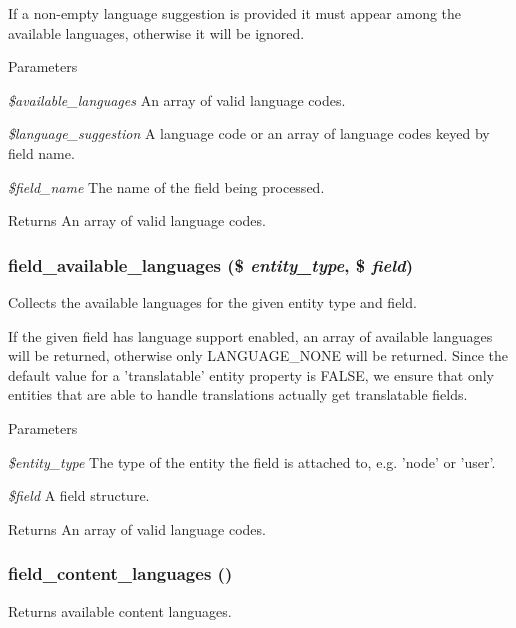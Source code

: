 If a non-\/empty language suggestion is provided it must appear among the available languages, otherwise it will be ignored.


\begin{DoxyParams}{Parameters}
\item[{\em \$available\_\-languages}]An array of valid language codes. \item[{\em \$language\_\-suggestion}]A language code or an array of language codes keyed by field name. \item[{\em \$field\_\-name}]The name of the field being processed.\end{DoxyParams}
\begin{DoxyReturn}{Returns}
An array of valid language codes. 
\end{DoxyReturn}
\hypertarget{group__field__language_ga3dbd9611836d9bba15c15f0a8ae83c9b}{
\subsubsection[{field\_\-available\_\-languages}]{\setlength{\rightskip}{0pt plus 5cm}field\_\-available\_\-languages (\$ {\em entity\_\-type}, \/  \$ {\em field})}}
\label{group__field__language_ga3dbd9611836d9bba15c15f0a8ae83c9b}
Collects the available languages for the given entity type and field.

If the given field has language support enabled, an array of available languages will be returned, otherwise only LANGUAGE\_\-NONE will be returned. Since the default value for a 'translatable' entity property is FALSE, we ensure that only entities that are able to handle translations actually get translatable fields.


\begin{DoxyParams}{Parameters}
\item[{\em \$entity\_\-type}]The type of the entity the field is attached to, e.g. 'node' or 'user'. \item[{\em \$field}]A field structure.\end{DoxyParams}
\begin{DoxyReturn}{Returns}
An array of valid language codes. 
\end{DoxyReturn}
\hypertarget{group__field__language_ga78c369e7b76edbb662d8f2e04bc82ad4}{
\subsubsection[{field\_\-content\_\-languages}]{\setlength{\rightskip}{0pt plus 5cm}field\_\-content\_\-languages ()}}
\label{group__field__language_ga78c369e7b76edbb662d8f2e04bc82ad4}
Returns available content languages.

